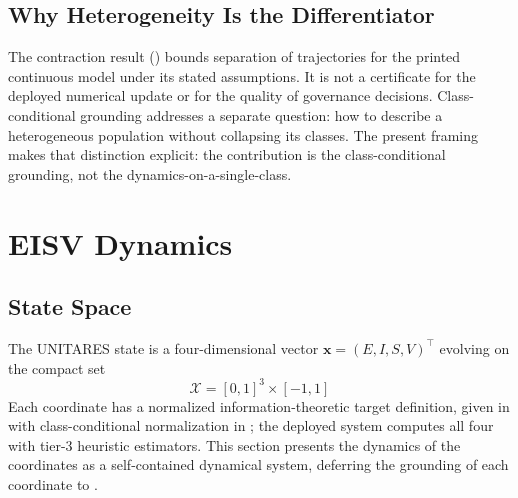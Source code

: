 \documentclass[11pt,twocolumn]{article}
\newcommand{\eisv}{\ensuremath{\mathbf{x}}}
\begin{document}
\subsection{Why Heterogeneity Is the Differentiator}

The contraction result () bounds
separation of trajectories for the printed continuous model under
its stated assumptions. It is not a certificate for the deployed
numerical update or for the quality of governance decisions.
Class-conditional grounding addresses a separate question: how
to describe a heterogeneous population without collapsing its classes.
The present framing makes that distinction explicit: the
contribution is the class-conditional grounding, not the
dynamics-on-a-single-class.

\section{EISV Dynamics}
\label{sec:dynamics}

\subsection{State Space}

The UNITARES state is a four-dimensional vector
$\eisv = (E, I, S, V)^\top$ evolving on the compact set
\[
  \mathcal{X} = [0,1]^3 \times [-1, 1]
\]
Each coordinate has a normalized information-theoretic target
definition, given in  with class-conditional
normalization in ; the deployed system
computes all four with tier-3 heuristic estimators.
This section presents the dynamics of the coordinates as a
self-contained dynamical system, deferring the grounding of each
coordinate to .
\end{document}
